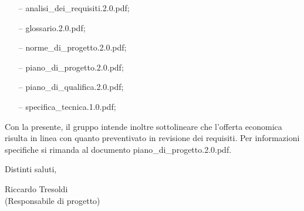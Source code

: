 \documentclass[a4paper,10pt]{letter}
\begin{document}
\begin{itemize}
\item[--] analisi\_dei\_requisiti.2.0.pdf;
\item[--] glossario.2.0.pdf;
\item[--] norme\_di\_progetto.2.0.pdf;
\item[--] piano\_di\_progetto.2.0.pdf;
\item[--] piano\_di\_qualifica.2.0.pdf;
\item[--] specifica\_tecnica.1.0.pdf;
\end{itemize}

Con la presente, il gruppo intende inoltre sottolineare che l'offerta economica risulta in linea con quanto preventivato in revisione dei requisiti. Per informazioni specifiche si rimanda al documento piano\_di\_progetto.2.0.pdf.
\bigskip

Distinti saluti,

\bigskip

\begin{flushright}
\begin{minipage}[t]{.35\textwidth}
Riccardo Tresoldi\\
(Responsabile di progetto)
\end{minipage}
\end{flushright}
\end{document}
